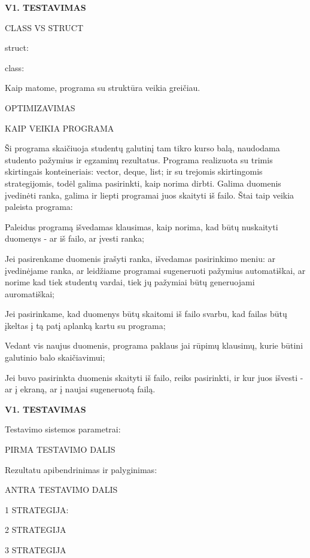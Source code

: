 {\bfseries{V1. TESTAVIMAS}}

CLASS VS STRUCT

struct\+:

 

class\+:

 

Kaip matome, programa su struktūra veikia greičiau.

OPTIMIZAVIMAS





KAIP VEIKIA PROGRAMA

Ši programa skaičiuoja studentų galutinį tam tikro kurso balą, naudodama studento pažymius ir egzaminų rezultatus. Programa realizuota su trimis skirtingais konteineriais\+: vector, deque, list; ir su trejomis skirtingomis strategijomis, todėl galima pasirinkti, kaip norima dirbti. Galima duomenis įvedinėti ranka, galima ir liepti programai juos skaityti iš failo. Štai taip veikia paleista programa\+:


\begin{DoxyEnumerate}
\item Paleidus programą išvedamas klausimas, kaip norima, kad būtų nuskaityti duomenys -\/ ar iš failo, ar įvesti ranka;
\item Jei pasirenkame duomenis įrašyti ranka, išvedamas pasirinkimo meniu\+: ar įvedinėjame ranka, ar leidžiame programai sugeneruoti pažymius automatiškai, ar norime kad tiek studentų vardai, tiek jų pažymiai būtų generuojami auromatiškai;
\item Jei pasirinkame, kad duomenys būtų skaitomi iš failo svarbu, kad failas būtų įkeltas į tą patį aplanką kartu su programa;
\item Vedant vis naujus duomenis, programa paklaus jai rūpimų klausimų, kurie būtini galutinio balo skaičiavimui;
\item Jei buvo pasirinkta duomenis skaityti iš failo, reiks pasirinkti, ir kur juos išvesti -\/ ar į ekraną, ar į naujai sugeneruotą failą.
\end{DoxyEnumerate}

{\bfseries{V1. TESTAVIMAS}}

 Testavimo sistemos parametrai\+: 



PIRMA TESTAVIMO DALIS



Rezultatu apibendrinimas ir palyginimas\+:





ANTRA TESTAVIMO DALIS



1 STRATEGIJA\+:



2 STRATEGIJA



3 STRATEGIJA

 